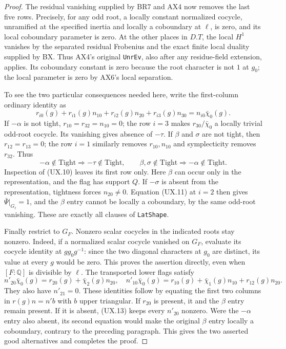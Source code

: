 \begin{proof}
The residual vanishing supplied by BR7 and AX4 now removes
the last five rows.  Precisely, for any odd root, a
locally constant normalized cocycle, unramified at the
specified inertia and locally a coboundary at $\ell$,
is zero, and its local coboundary parameter is zero.
At the other places in $D.T$, the local $H^1$ vanishes
by the separated residual Frobenius and the exact finite
local duality supplied by BX.  Thus AX4's original
\texttt{UnrEv}, also after any residue-field extension,
applies.  Its coboundary constant is zero because the
root character is not $1$ at $g_0$; the local parameter
is zero by AX6's local separation.

To see the two particular consequences needed here, write
the first-column ordinary identity as
\[
 r_{i0}(g)+r_{i1}(g)n_{10}+r_{i2}(g)n_{20}
       +r_{i3}(g)n_{30}=n_{i0}\bar\chi_0(g).
 \tag{UX.11}
\]
If $-\alpha$ is not tight, $r_{10}=r_{32}=n_{10}=0$;
the row $i=3$ makes $r_{30}/\bar\chi_0$ a locally
trivial odd-root cocycle.  Its vanishing gives absence
of $-\tau$.  If $\beta$ and $\sigma$ are not tight,
then $r_{12}=r_{13}=0$; the row $i=1$ similarly removes
$r_{10},n_{10}$ and symplecticity removes $r_{32}$.
Thus
\[
 -\alpha\notin\mathrm{Tight}\Rightarrow
 -\tau\notin\mathrm{Tight},\qquad
 \beta,\sigma\notin\mathrm{Tight}\Rightarrow
 -\alpha\notin\mathrm{Tight}.
 \tag{UX.12}
\]
Inspection of (UX.10) leaves its first row only.
Here $\beta$ can occur only in the representation, and
the flag has support $Q$.  If $-\sigma$ is absent from
the representation, tightness forces $n_{20}\ne0$.
Equation (UX.11) at $i=2$ then gives
$\bar\Psi|_{G_\ell}=1$, and the $\beta$ entry cannot
be locally a coboundary, by the same odd-root vanishing.
These are exactly all clauses of \texttt{LatShape}.

Finally restrict to $G_F$.  Nonzero scalar cocycles in
the indicated roots stay nonzero.  Indeed, if a
normalized scalar cocycle vanished on $G_F$, evaluate
its cocycle identity at $g g_0g^{-1}$: since the two
diagonal characters at $g_0$ are distinct, its value
at every $g$ would be zero.  This proves the assertion
directly, even when $[F:\mathbb Q]$ is divisible by
$\ell$.  The transported lower flags satisfy
\[
 n'_{20}\bar\chi_0(g)=r_{20}(g)+\bar\chi_2(g)n_{20},
 \quad
 n'_{10}\bar\chi_0(g)=r_{10}(g)+\bar\chi_1(g)n_{10}
                                      +r_{12}(g)n_{20}.
 \tag{UX.13}
\]
They also have $n'_{21}=0$.  These identities follow by
equating the first two columns in $r(g)n=n'b$ with $b$
upper triangular.  If $r_{20}$ is present, it and the
$\beta$ entry remain present.  If it is absent,
(UX.13) keeps every $n'_{20}$ nonzero.  Were the
$-\alpha$ entry also absent, its second equation would
make the original $\beta$ entry locally a coboundary,
contrary to the preceding paragraph.  This gives the
two asserted good alternatives and completes the proof.
\end{proof}

